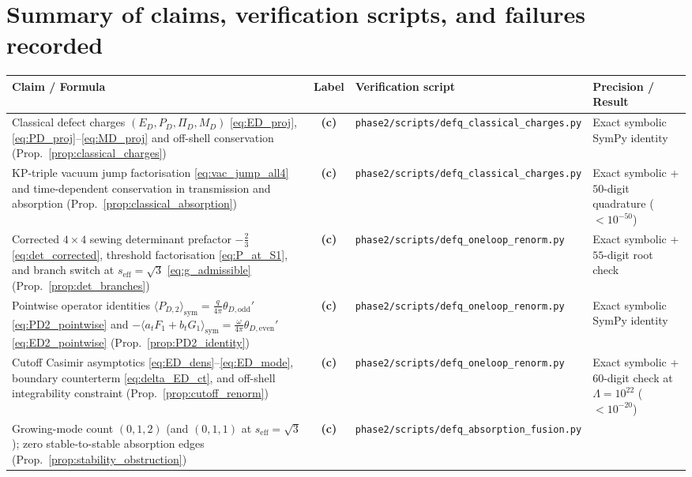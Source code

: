 \documentclass[11pt,a4paper]{article}
\newcommand{\Lc}{\textsf{\textbf{(c)}}}
\newcommand{\sclass}{\texttt{phase2/\allowbreak scripts/\allowbreak defq\_\allowbreak classical\_\allowbreak charges.py}}
\newcommand{\sren}{\texttt{phase2/\allowbreak scripts/\allowbreak defq\_\allowbreak oneloop\_\allowbreak renorm.py}}
\newcommand{\sfus}{\texttt{phase2/\allowbreak scripts/\allowbreak defq\_\allowbreak absorption\_\allowbreak fusion.py}}
\theoremstyle{remark}
\begin{document}
\section{Summary of claims, verification scripts, and failures recorded}
\label{sec:failures}

\begin{table}[htbp]
\centering
\footnotesize
\begin{tabular}{@{}p{4.8cm} c p{4.6cm} p{3.8cm}@{}}
\toprule
\textbf{Claim / Formula} & \textbf{Label} & \textbf{Verification script} & \textbf{Precision / Result} \\
\midrule
Classical defect charges $(E_D,P_D,\Pi_D,M_D)$ \eqref{eq:ED_proj}, \eqref{eq:PD_proj}--\eqref{eq:MD_proj} and off-shell conservation (Prop.~\ref{prop:classical_charges}) &
\Lc & \sclass &
Exact symbolic SymPy identity \\
\addlinespace
KP-triple vacuum jump factorisation \eqref{eq:vac_jump_all4} and time-dependent conservation in transmission and absorption (Prop.~\ref{prop:classical_absorption}) &
\Lc & \sclass &
Exact symbolic + $50$-digit quadrature ($<10^{-50}$) \\
\addlinespace
Corrected $4\times 4$ sewing determinant prefactor $-\frac{2}{3}$ \eqref{eq:det_corrected}, threshold factorisation \eqref{eq:P_at_S1}, and branch switch at $s_{\mathrm{eff}}=\sqrt{3}$ \eqref{eq:g_admissible} (Prop.~\ref{prop:det_branches}) &
\Lc & \sren &
Exact symbolic + $55$-digit root check \\
\addlinespace
Pointwise operator identities $\langle P_{D,2}\rangle_{\mathrm{sym}} = \frac{q}{4\pi}\theta_{D,\mathrm{odd}}'$ \eqref{eq:PD2_pointwise} and $-\langle a_t F_1+b_t G_1\rangle_{\mathrm{sym}} = \frac{\omega}{4\pi}\theta_{D,\mathrm{even}}'$ \eqref{eq:ED2_pointwise} (Prop.~\ref{prop:PD2_identity}) &
\Lc & \sren &
Exact symbolic SymPy identity \\
\addlinespace
Cutoff Casimir asymptotics \eqref{eq:ED_dens}--\eqref{eq:ED_mode}, boundary counterterm \eqref{eq:delta_ED_ct}, and off-shell integrability constraint (Prop.~\ref{prop:cutoff_renorm}) &
\Lc & \sren &
Exact symbolic + $60$-digit check at $\Lambda=10^{22}$ ($<10^{-20}$) \\
\addlinespace
Growing-mode count $(0,1,2)$ (and $(0,1,1)$ at $s_{\mathrm{eff}}=\sqrt{3}$); zero stable-to-stable absorption edges (Prop.~\ref{prop:stability_obstruction}) &
\Lc & \sfus &

\end{tabular}
\end{table}
\end{document}
